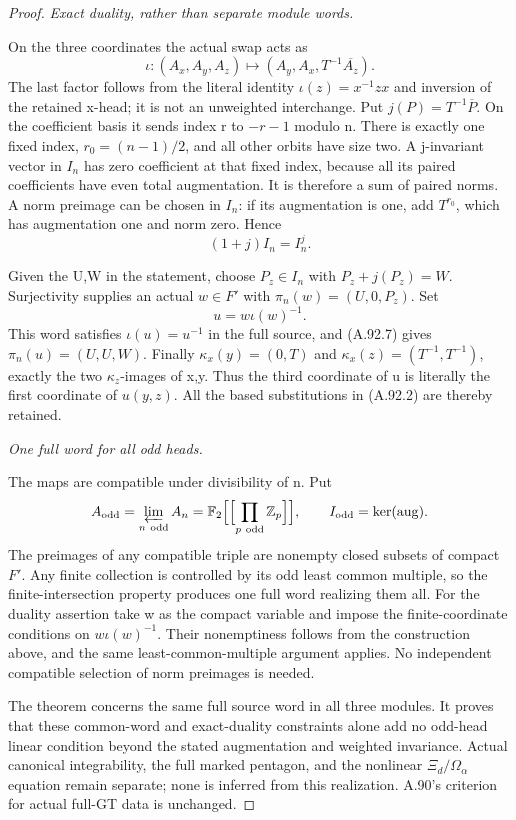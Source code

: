 \begin{proof}
\emph{Exact duality, rather than separate module words.}\par
On the three coordinates the actual swap acts as
\[
 \iota:(A_x,A_y,A_z)\longmapsto
                   (A_y,A_x,T^{-1}\overline{A_z}).
\tag{A.92.7}
\]
The last factor follows from the literal identity
\(\iota(z)=x^{-1}zx\) and inversion of the retained x-head;
it is not an unweighted interchange. Put
\(j(P)=T^{-1}\overline P\). On the coefficient basis it
sends index r to \(-r-1\) modulo n. There is exactly one
fixed index, \(r_0=(n-1)/2\), and all other orbits have size
two. A j-invariant vector in \(I_n\) has zero coefficient
at that fixed index, because all its paired coefficients have
even total augmentation. It is therefore a sum of paired norms.
A norm preimage can be chosen in \(I_n\): if its augmentation
is one, add \(T^{r_0}\), which has augmentation one and norm
zero. Hence
\[
                         (1+j)I_n=I_n^j.
\tag{A.92.8}
\]

Given the U,W in the statement, choose \(P_z\in I_n\) with
\(P_z+j(P_z)=W\). Surjectivity supplies an actual
\(w\in F'\) with \(\pi_n(w)=(U,0,P_z)\). Set
\[
                              u=w\iota(w)^{-1}.
\]
This word satisfies \(\iota(u)=u^{-1}\) in the full source,
and (A.92.7) gives \(\pi_n(u)=(U,U,W)\).
Finally \(\kappa_x(y)=(0,T)\) and
\(\kappa_x(z)=(T^{-1},T^{-1})\), exactly the two
\(\kappa_z\)-images of x,y. Thus the third coordinate of
u is literally the first coordinate of \(u(y,z)\).
All the based substitutions in (A.92.2) are thereby retained.

\emph{One full word for all odd heads.}\par
The maps are compatible under divisibility of n. Put
\[
 A_{\rm odd}=\varprojlim_{n\ \mathrm{odd}}A_n
   =\mathbb F_2\Bigl[\Bigl[\prod_{p\ \mathrm{odd}}\mathbb Z_p\Bigr]\Bigr],
 \qquad I_{\rm odd}=\ker(\operatorname{aug}).
\]
The preimages of any compatible triple are nonempty closed
subsets of compact \(F'\). Any finite collection is controlled
by its odd least common multiple, so the finite-intersection
property produces one full word realizing them all.
For the duality assertion take w as the compact variable and
impose the finite-coordinate conditions on
\(w\iota(w)^{-1}\). Their nonemptiness follows from the
construction above, and the same least-common-multiple argument
applies. No independent compatible selection of norm preimages
is needed.

The theorem concerns the same full source word in all three
modules. It proves that these common-word and exact-duality
constraints alone add no odd-head linear condition beyond the
stated augmentation and weighted invariance. Actual canonical
integrability, the full marked pentagon, and the nonlinear
\(\Xi_d/\Omega_\alpha\) equation remain separate; none is
inferred from this realization. A.90's criterion for actual
full-GT data is unchanged.
\end{proof}
